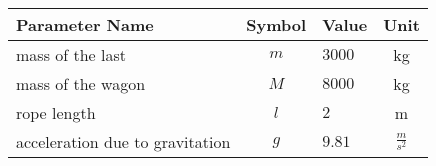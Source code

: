\begin{tabular}{lclc}
\hline
 Parameter Name                  &  Symbol  & Value   &      Unit       \\
\hline
 mass of the last                &   $m$    & $3000$  &       kg        \\
 mass of the wagon               &   $M$    & $8000$  &       kg        \\
 rope length                     &   $l$    & $2$     &        m        \\
 acceleration due to gravitation &   $g$    & $9.81$  & $\frac{m}{s^2}$ \\
\hline
\end{tabular}